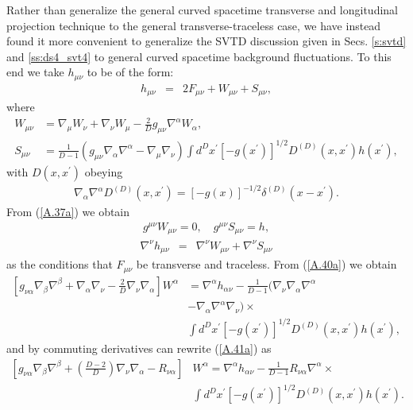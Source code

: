 Rather than generalize the general curved spacetime transverse and longitudinal projection technique to the general transverse-traceless case, we have instead  found it more convenient to generalize the SVTD discussion given in Secs. \ref{s:svtd} and \ref{ss:ds4_svt4} to general curved spacetime background fluctuations. To this end we take $h_{\mu\nu}$ to be of the form:
%
\begin{eqnarray}
h_{\mu\nu} &=& 2F_{\mu\nu}+W_{\mu\nu}+S_{\mu\nu},
\label{A.36a}
\end{eqnarray}
%
where
%
\begin{align}
W_{\mu\nu} &=\nabla_\mu W_\nu + \nabla_\nu W_\mu - \frac{2}{D}g_{\mu\nu}\nabla^\alpha W_\alpha,
\nonumber\\
S_{\mu\nu}&=\frac{1}{D-1}\left( g_{\mu\nu}\nabla_\alpha \nabla^\alpha - \nabla_\mu\nabla_\nu\right)\int d^Dx^{\prime}[-g(x^{\prime})]^{1/2}D^{(D)}(x,x^{\prime}) h(x^{\prime}),
\label{A.37a}
\end{align}
%
with $D(x,x^{\prime})$ obeying
%
\begin{eqnarray}
\nabla_\alpha \nabla^\alpha D^{(D)}(x,x^{\prime}) =[-g(x)]^{-1/2}\delta^{(D)}(x-x^{\prime}).
\label{A.38a}
\end{eqnarray}
%
From (\ref{A.37a}) we obtain
%
\begin{eqnarray}
g^{\mu\nu}W_{\mu\nu}=0,\quad g^{\mu\nu}S_{\mu\nu}=h,
\label{A.39a}
\end{eqnarray}
%
%
\begin{eqnarray}
\nabla^\nu h_{\mu\nu} &=& \nabla^\nu W_{\mu\nu} + \nabla^\nu S_{\mu\nu}
\label{A.40a}
\end{eqnarray}
%
as the conditions that $F_{\mu\nu}$ be transverse and traceless. From (\ref{A.40a}) we obtain 
%
\begin{align}
\left[g_{\nu\alpha} \nabla_\beta \nabla^\beta +\nabla_\alpha \nabla_\nu - \frac{2}{D}\nabla_\nu\nabla_\alpha\right] W^\alpha
&=\nabla^\alpha h_{\alpha\nu} - \frac{1}{D-1}(\nabla_\nu \nabla_\alpha\nabla^\alpha 
\nonumber\\
&- \nabla_\alpha\nabla^\alpha \nabla_\nu)\times
\nonumber\\
&
\int d^Dx^{\prime}[-g(x^{\prime})]^{1/2} D^{(D)}(x,x^{\prime}) h(x^{\prime}),
\label{A.41a}
\end{align}
%
and by commuting derivatives can rewrite (\ref{A.41a}) as
%
\begin{align}
\left[g_{\nu\alpha}\nabla_\beta\nabla^\beta + \left(\frac{D-2}{D}\right)\nabla_\nu \nabla_\alpha - R_{\nu\alpha}\right]&W^\alpha
= \nabla^\alpha h_{\alpha\nu} - \frac{1}{D-1}R_{\nu\alpha}\nabla^\alpha \times
\nonumber\\
&\int d^Dx^{\prime}[-g(x^{\prime})]^{1/2}D^{(D)}(x,x^{\prime}) h(x^{\prime}).
\label{A.42a}
\end{align}
%

